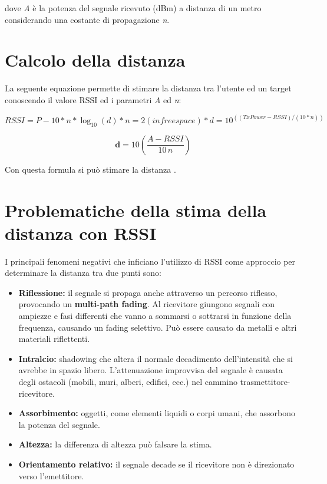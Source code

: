 dove \textit{A} è la potenza del segnale ricevuto (dBm) a distanza di un metro considerando una costante di propagazione \textit{n}.

\section{Calcolo della distanza}
La seguente equazione permette di stimare la distanza tra l'utente ed un target conoscendo il valore RSSI ed i parametri \textit{A} ed \textit{n}:

\begin{equation}\label{key}
RSSI = P - 10 * n * \log_10(d)
* n = 2 (in free space)
* d = 10 ^ ((TxPower - RSSI) / (10 * n))
\end{equation}

\begin{equation}
\textbf{d} = 10 \left( \frac{A − RSSI}{10\,n} \right)
\end{equation}

Con questa formula si può stimare la distanza .

\section{Problematiche della stima della distanza con RSSI}\label{ch:problematiche}
I principali fenomeni negativi che inficiano l'utilizzo di RSSI come approccio per determinare la distanza tra due punti sono:
\begin{itemize}
	\item \textbf{Riflessione:} il segnale si propaga anche attraverso un percorso riflesso, provocando un \textbf{multi-path fading}. Al ricevitore giungono segnali con ampiezze e fasi differenti che vanno a sommarsi o sottrarsi in funzione della frequenza, causando un fading selettivo. Può essere causato da metalli e altri materiali riflettenti.
	\item \textbf{Intralcio:} shadowing che altera il normale decadimento dell’intensità che si avrebbe in spazio libero. L’attenuazione improvvisa del segnale è causata degli ostacoli (mobili, muri, alberi, edifici, ecc.) nel cammino trasmettitore-ricevitore.
	\item \textbf{Assorbimento:} oggetti, come elementi liquidi o corpi umani, che assorbono la potenza del segnale.
	\item \textbf{Altezza:} la differenza di altezza può falsare la stima.
	\item \textbf{Orientamento relativo:} il segnale decade se il ricevitore non è direzionato verso l'emettitore.
\end{itemize}

